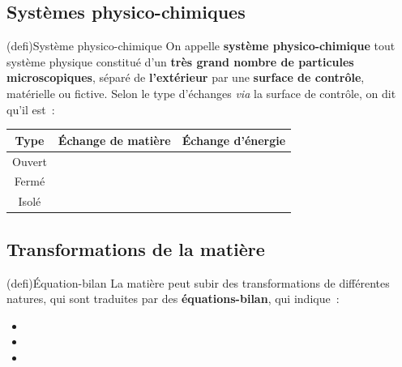 \documentclass[../../main/main.tex]{subfiles}
\begin{document}
\subsection{Systèmes physico-chimiques}
\begin{tcb*}(defi){Système physico-chimique}
	On appelle \textbf{système physico-chimique} tout système physique constitué
	d'un \textbf{très grand nombre de particules microscopiques}, séparé de
	\textbf{l'extérieur} par une \textbf{surface de contrôle}, matérielle ou
	fictive. Selon le type d'échanges \textit{via} la surface de contrôle, on dit
	qu'il est~:
	\begin{center}
		\begin{tabular}{ccc}
			\toprule
			\textbf{Type} & \textbf{Échange de matière} & \textbf{Échange d'énergie}
			\\
			\midrule
			Ouvert        & \psw{\cmark}                & \psw{\cmark}
			\\
			Fermé         & \psw{\xmark}                & \psw{\cmark}
			\\
			Isolé         & \psw{\xmark}                & \psw{\xmark}
			\\
			\bottomrule
		\end{tabular}
	\end{center}
\end{tcb*}

\subsection{Transformations de la matière}

\begin{tcb*}(defi){Équation-bilan}
	La matière peut subir des transformations de différentes natures, qui sont
	traduites par des \textbf{équations-bilan}, qui indique~:
	\begin{itemize}
		\item {}%
		\item {}%
		\item {}%
	\end{itemize}
\end{tcb*}
\end{document}

